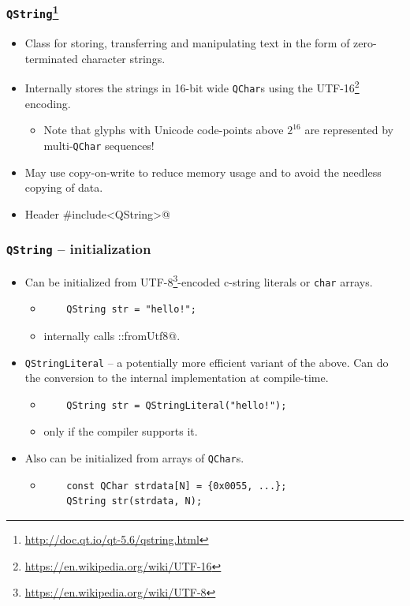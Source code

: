\begin{frame}[fragile]
  \frametitle{\texttt{QString}\footnote
    {\url{http://doc.qt.io/qt-5.6/qstring.html}}}
  \begin{itemize}
    \item Class for storing, transferring and manipulating text in the form of
      zero-terminated character strings.
    \item Internally stores the strings in 16-bit wide \texttt{QChar}s using
      the UTF-16\footnote{\url{https://en.wikipedia.org/wiki/UTF-16}} encoding.
    \begin{itemize}
      \item Note that glyphs with Unicode code-points above $2^{16}$ are
        represented by multi-\texttt{QChar} sequences!
    \end{itemize}
    \item May use copy-on-write to reduce memory usage and to avoid the needless
      copying of data.
    \item Header \verb@#include<QString>@
  \end{itemize}
\end{frame}

\begin{frame}[fragile]
  \frametitle{\texttt{QString} -- initialization}
  \begin{itemize}
    \item Can be initialized from UTF-8\footnote
     {\url{https://en.wikipedia.org/wiki/UTF-8}}-encoded c-string literals or
     \texttt{char} arrays.
    \begin{itemize}
      \item
      \begin{verbatim}
	QString str = "hello!";
      \end{verbatim}
      \item internally calls \verb@QString::fromUtf8@.
    \end{itemize}
    \item \texttt{QStringLiteral} -- a potentially more efficient variant of
      the above. Can do the conversion to the internal implementation at
      compile-time.
    \begin{itemize}
      \item
      \begin{verbatim}
	QString str = QStringLiteral("hello!");
      \end{verbatim}
      \item only if the compiler supports it.
    \end{itemize}
    \item Also can be initialized from arrays of \texttt{QChar}s.
    \begin{itemize}
      \item
      \begin{verbatim}
	const QChar strdata[N] = {0x0055, ...};
	QString str(strdata, N);
      \end{verbatim}
    \end{itemize}
  \end{itemize}
\end{frame}

